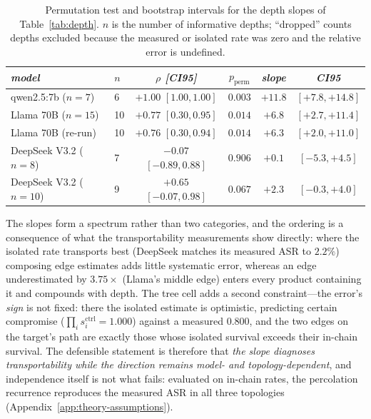 \documentclass[sigconf,anonymous]{aamas}
\newcommand{\scite}[1]{\ensuremath{s^{\mathrm{ctrl}}_{#1}}}
\begin{document}
\begin{table}[h]
\scriptsize
\centering
\caption{Permutation test and bootstrap intervals for the depth slopes of
Table~\ref{tab:depth}. $n$ is the number of informative depths; ``dropped'' counts
depths excluded because the measured or isolated rate was zero and the relative error
is undefined.}
\vspace{4pt}
\label{tab:depth-perm}
\setlength{\tabcolsep}{3pt}
\begin{tabular}{llcccc}
\toprule
\textit{model} & \textit{$n$} & \textit{$\rho$ [CI95]} & \textit{$p_{\mathrm{perm}}$}
& \textit{slope} & \textit{CI95} \\
\midrule
qwen2.5:7b ($n{=}7$)    & 6 & $+1.00$ $[1.00, 1.00]$ & $0.003$ & $+11.8$ & $[+7.8, +14.8]$ \\
Llama 70B ($n{=}15$)    & 10 & $+0.77$ $[0.30, 0.95]$ & $0.014$ & $+6.8$ & $[+2.7, +11.4]$ \\
Llama 70B (re-run)      & 10 & $+0.76$ $[0.30, 0.94]$ & $0.014$ & $+6.3$ & $[+2.0, +11.0]$ \\
DeepSeek V3.2 ($n{=}8$) & 7 & $-0.07$ $[-0.89, 0.88]$ & $0.906$ & $+0.1$ & $[-5.3, +4.5]$ \\
DeepSeek V3.2 ($n{=}10$) & 9 & $+0.65$ $[-0.07, 0.98]$ & $0.067$ & $+2.3$ & $[-0.3, +4.0]$ \\
\bottomrule
\end{tabular}
\end{table}

The slopes form a spectrum rather than two categories, and the ordering is a
consequence of what the transportability measurements show directly: where the
isolated rate transports best (DeepSeek matches its measured ASR to $2.2\%$)
composing edge estimates adds little systematic error, whereas an edge underestimated
by $3.75\times$ (Llama's middle edge) enters every product containing it and compounds
with depth. The tree cell adds a second constraint---the error's \emph{sign} is not
fixed: there the isolated estimate is optimistic, predicting certain compromise
($\prod_i \scite{i} = 1.000$) against a measured $0.800$, and the two edges on the
target's path are exactly those whose isolated survival exceeds their in-chain
survival. The defensible statement is therefore that \emph{the slope diagnoses
transportability while the direction remains model- and topology-dependent}, and
independence itself is not what fails: evaluated on in-chain rates, the percolation
recurrence reproduces the measured ASR in all three topologies
(Appendix~\ref{app:theory-assumptions}).
\end{document}

